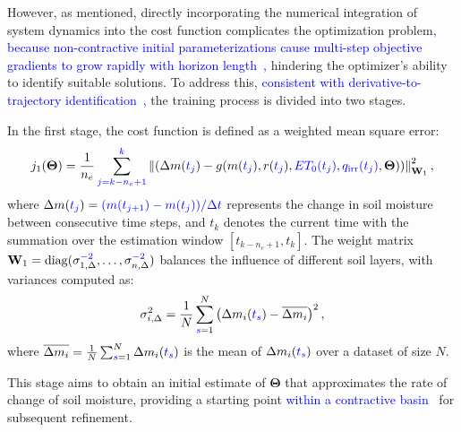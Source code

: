 \documentclass[pdflatex,sn-nature]{sn-jnl}%
\theoremstyle{thmstyleone}%
\theoremstyle{thmstyletwo}%
\theoremstyle{thmstylethree}%
\begin{document}
However, as mentioned, directly incorporating the numerical integration of system dynamics into the cost function complicates the optimization problem\textcolor{blue}{, because non-contractive initial parameterizations cause multi-step objective gradients to grow rapidly with horizon length~\cite{Ribeiro2020},} hindering the optimizer's ability to identify suitable solutions. To address this, \textcolor{blue}{consistent with derivative-to-trajectory identification~\cite{Bradley2021, Aguirre2010},} the training process is divided into two stages.

In the first stage, the cost function is defined as a weighted mean square error:
\begin{equation}
    j_{1}(\boldsymbol{\Theta}) = 
    \frac{1}{n_e} \sum_{\textcolor{blue}{j = k - n_e + 1}}^{\textcolor{blue}{k}} 
    \left\| 
         \left( 
            \Delta m(\textcolor{blue}{t_j}) - g(m(\textcolor{blue}{t_j}), r(\textcolor{blue}{t_j}), \textcolor{blue}{ET_0(t_j)}, \textcolor{blue}{q_{\mathrm{irr}}(t_j)}, \boldsymbol{\Theta}) 
        \right) 
    \right\|_{\mathbf{W}_1}^2,
    \label{eq:j1}
\end{equation}
where \( \Delta m(\textcolor{blue}{t_j}) = \textcolor{blue}{(m(t_{j+1}) - m(t_j))/\Delta t} \) represents the change in soil moisture between consecutive time steps, and \( t_k \) denotes the current time with the summation over the estimation window \( [t_{k - n_e + 1}, t_k] \). The weight matrix \( \mathbf{W}_1 = \operatorname{diag}(\sigma_{1,\Delta}^{\textcolor{blue}{-2}}, \dots, \sigma_{n,\Delta}^{\textcolor{blue}{-2}}) \) balances the influence of different soil layers, with variances computed as:
\[
    \sigma_{i,\Delta}^{2} = \frac{1}{N} \sum_{\textcolor{blue}{s}=1}^{N} \left( \Delta m_i(\textcolor{blue}{t_s}) - \overline{\Delta m_i} \right)^{2},
\]
where \( \overline{\Delta m_i} = \frac{1}{N} \sum_{\textcolor{blue}{s}=1}^{N} \Delta m_i(\textcolor{blue}{t_s}) \) is the mean of \( \Delta m_i(\textcolor{blue}{t_s}) \) over a dataset of size \( N \).

This stage aims to obtain an initial estimate of \( \boldsymbol{\Theta} \) that approximates the rate of change of soil moisture, providing a starting point \textcolor{blue}{within a contractive basin~\cite{Bradley2021}} for subsequent refinement.
\end{document}
